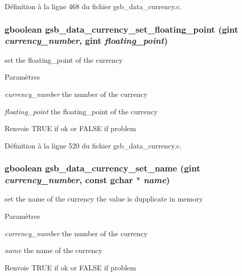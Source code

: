 Définition à la ligne 468 du fichier gsb\_\-data\_\-currency.c.

\subsubsection[{gsb\_\-data\_\-currency\_\-set\_\-floating\_\-point}]{\setlength{\rightskip}{0pt plus 5cm}gboolean gsb\_\-data\_\-currency\_\-set\_\-floating\_\-point (gint {\em currency\_\-number}, \/  gint {\em floating\_\-point})}\label{gsb__data__currency_8h_a2baf075afdbe4d02b0a04831075ea8ae}
set the floating\_\-point of the currency


\begin{DoxyParams}{Paramètres}
\item[{\em currency\_\-number}]the number of the currency \item[{\em floating\_\-point}]the floating\_\-point of the currency\end{DoxyParams}
\begin{DoxyReturn}{Renvoie}
TRUE if ok or FALSE if problem 
\end{DoxyReturn}


Définition à la ligne 520 du fichier gsb\_\-data\_\-currency.c.

\subsubsection[{gsb\_\-data\_\-currency\_\-set\_\-name}]{\setlength{\rightskip}{0pt plus 5cm}gboolean gsb\_\-data\_\-currency\_\-set\_\-name (gint {\em currency\_\-number}, \/  const gchar $\ast$ {\em name})}\label{gsb__data__currency_8h_aa407b241b0ee4aed437ed05f7ede00bb}
set the name of the currency the value is dupplicate in memory


\begin{DoxyParams}{Paramètres}
\item[{\em currency\_\-number}]the number of the currency \item[{\em name}]the name of the currency\end{DoxyParams}
\begin{DoxyReturn}{Renvoie}
TRUE if ok or FALSE if problem 
\end{DoxyReturn}


